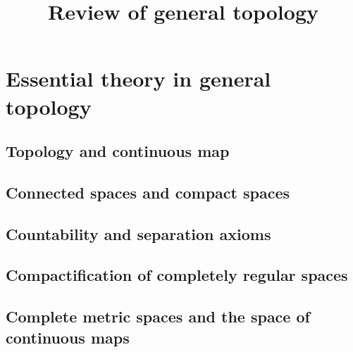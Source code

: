 





\title{Review of general topology}


\author{}

\maketitle

\setcounter{tocdepth}{1}
\tableofcontents

\part{Essential theory in general topology}
\chapter{Topology and continuous map}\label{topology}
    
    
    
\chapter{Connected spaces and compact spaces}\label{connectedness and compactness}
    
    
    
    
    
    
\chapter{Countability and separation axioms}\label{countability and separation axioms}
    
    
    
     
\chapter{Compactification of completely regular spaces}\label{compactification}
    
    
\chapter{Complete metric spaces and the space of continuous maps}\label{completeness and C0 spaces}
    
    
    
    

